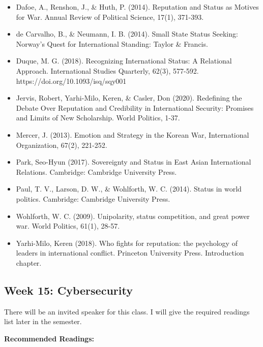 \documentclass[
  letterpaper,
  DIV=11,
  numbers=noendperiod]{scrartcl}
\providecommand{\tightlist}{%
  \setlength{\itemsep}{0pt}\setlength{\parskip}{0pt}}\usepackage{longtable,booktabs,array}
\begin{document}
\begin{itemize}
\tightlist
\item
  Dafoe, A., Renshon, J., \& Huth, P. (2014). Reputation and Status as
  Motives for War. Annual Review of Political Science, 17(1), 371-393.
\item
  de Carvalho, B., \& Neumann, I. B. (2014). Small State Status Seeking:
  Norway's Quest for International Standing: Taylor \& Francis.
\item
  Duque, M. G. (2018). Recognizing International Status: A Relational
  Approach. International Studies Quarterly, 62(3), 577-592.
  https://doi.org/10.1093/isq/sqy001
\item
  Jervis, Robert, Yarhi-Milo, Keren, \& Casler, Don (2020). Redefining
  the Debate Over Reputation and Credibility in International Security:
  Promises and Limits of New Scholarship. World Politics, 1-37.
\item
  Mercer, J. (2013). Emotion and Strategy in the Korean War,
  International Organization, 67(2), 221-252.
\item
  Park, Seo-Hyun (2017). Sovereignty and Status in East Asian
  International Relations. Cambridge: Cambridge University Press.
\item
  Paul, T. V., Larson, D. W., \& Wohlforth, W. C. (2014). Status in
  world politics. Cambridge: Cambridge University Press.
\item
  Wohlforth, W. C. (2009). Unipolarity, status competition, and great
  power war. World Politics, 61(1), 28-57.
\item
  Yarhi-Milo, Keren (2018). Who fights for reputation: the psychology of
  leaders in international conflict. Princeton University Press.
  Introduction chapter.
\end{itemize}

\hypertarget{week-15-cybersecurity}{%
\subsection*{Week 15: Cybersecurity}\label{week-15-cybersecurity}}

There will be an invited speaker for this class. I will give the
required readings list later in the semester.

\textbf{Recommended Readings:}
\end{document}
